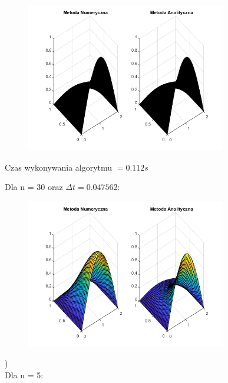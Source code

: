 \begin{figure}[!ht]
	\begin{center}
		\includegraphics[width=0.78\textwidth]{Lab7/charts/df/30.png}
	\end{center}
\end{figure}


Czas wykonywania algorytmu $ = 0.112 s$

Dla n = 30 oraz $\Delta t = 0.047562$:

\begin{figure}[!ht]
	\begin{center}
		\includegraphics[width=0.78\textwidth]{Lab7/charts/df/30_k.png}
	\end{center}
\end{figure}
\FloatBarrier
{})\\

Dla n = 5:

